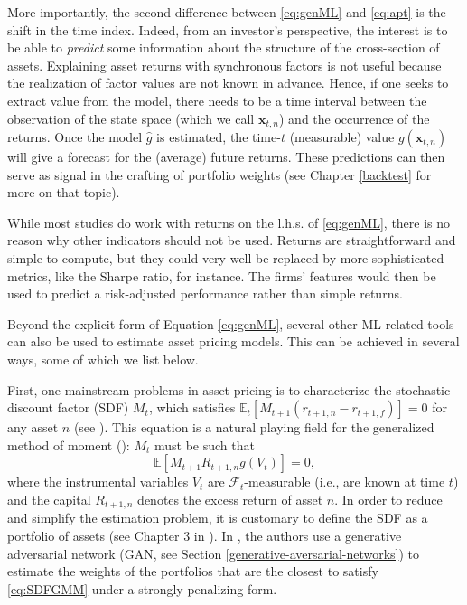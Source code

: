 \documentclass[]{krantz}
\theoremstyle{definition}
\theoremstyle{definition}
\theoremstyle{definition}
\theoremstyle{remark}
\begin{document}
More importantly, the second difference between \eqref{eq:genML} and
\eqref{eq:apt} is the shift in the time index. Indeed, from an investor's
perspective, the interest is to be able to \emph{predict} some
information about the structure of the cross-section of assets.
Explaining asset returns with synchronous factors is not useful because
the realization of factor values are not known in advance. Hence, if one
seeks to extract value from the model, there needs to be a time interval
between the observation of the state space (which we call
\(\textbf{x}_{t,n}\)) and the occurrence of the returns. Once the model
\(\hat{g}\) is estimated, the time-\(t\) (measurable) value
\(g(\textbf{x}_{t,n})\) will give a forecast for the (average) future
returns. These predictions can then serve as signal in the crafting of
portfolio weights (see Chapter \ref{backtest} for more on that topic).

While most studies do work with returns on the l.h.s. of \eqref{eq:genML},
there is no reason why other indicators should not be used. Returns are
straightforward and simple to compute, but they could very well be
replaced by more sophisticated metrics, like the Sharpe ratio, for
instance. The firms' features would then be used to predict a
risk-adjusted performance rather than simple returns.

Beyond the explicit form of Equation \eqref{eq:genML}, several other
ML-related tools can also be used to estimate asset pricing models. This
can be achieved in several ways, some of which we list below.

First, one mainstream problems in asset pricing is to characterize the
stochastic discount factor (SDF) \(M_t\), which satisfies
\(\mathbb{E}_t[M_{t+1}(r_{t+1,n}-r_{t+1,f})]=0\) for any asset \(n\)
(see \citet{cochrane2009asset}). This equation is a natural playing
field for the generalized method of moment (\citet{hansen1982large}):
\(M_t\) must be such that \begin{equation}
\label{eq:SDFGMM}
\mathbb{E}[M_{t+1}R_{t+1,n}g(V_t)]=0,
\end{equation} where the instrumental variables \(V_t\) are
\(\mathcal{F}_t\)-measurable (i.e., are known at time \(t\)) and the
capital \(R_{t+1,n}\) denotes the excess return of asset \(n\). In order
to reduce and simplify the estimation problem, it is customary to define
the SDF as a portfolio of assets (see Chapter 3 in
\citet{back2010asset}). In \citet{chen2019deep}, the authors use a
generative adversarial network (GAN, see Section
\ref{generative-aversarial-networks}) to estimate the weights of the
portfolios that are the closest to satisfy \eqref{eq:SDFGMM} under a
strongly penalizing form.
\end{document}
